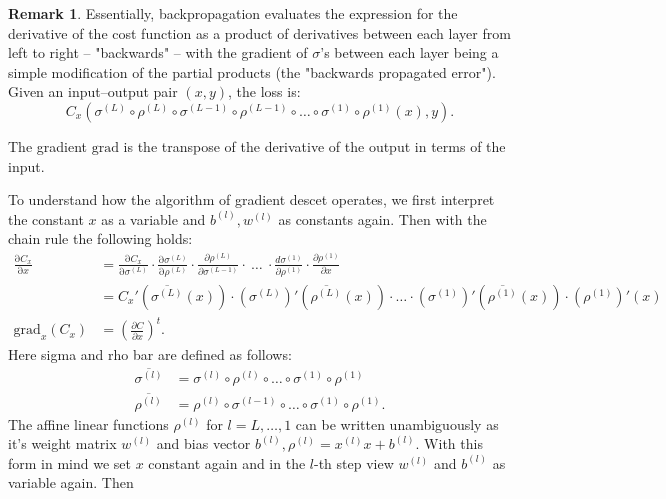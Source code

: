 \documentclass{article}
\theoremstyle{definition}
\newtheorem{remark}[theorem]{Remark}
\begin{document}
\begin{remark}
\label{com:back_prop_madness}
Essentially, backpropagation evaluates the expression for the derivative of the cost function as a product of derivatives between each layer from left to right – "backwards" – with the gradient of $\sigma$'s between each layer being a simple modification of the partial products (the "backwards propagated error").
Given an input–output pair $(x,y)$, the loss is:
$$C_{x}(\sigma^{(L)} \circ \rho^{(L)} \circ \sigma^{(L-1)} \circ \rho^{(L-1)} \circ \dots \circ \sigma^{(1)} \circ \rho^{(1)}(x), y).$$


The gradient $\text{grad}$ is the transpose of the derivative of the output in terms of the input.

To understand how the algorithm of gradient descet operates, we first interpret the constant $x$ as a variable and $b^{(l)}, w^{(l)}$ as constants again. Then with the chain rule the following holds:
\begin{align*}
\frac{\mathrm \partial C_{x}}{\mathrm \partial x} &= \frac{\mathrm \partial C_{x}}{\mathrm \partial \sigma^{(L)}} \cdot \frac{\mathrm \partial \sigma^{(L)}}{\mathrm \partial \rho^{(L)}} \cdot \frac{\partial \rho^{(L)}}{\partial \sigma^{(L-1)}} \cdot \ \ldots \ \cdot \frac{d \sigma^{(1)}}{\partial \rho^{(1)}} \cdot \frac{\partial \rho^{(1)}}{\partial x}\\
 &= C_{x}'(\overline{\sigma^{(L)}}(x)) \cdot (\sigma^{(L)})'(\overline{\rho^{(L)}}(x)) \cdot \dots \cdot (\sigma^{(1)})'(\overline{\rho^{(1)}}(x)) \cdot (\rho^{(1)})'(x) \\
\text{grad}_{x} (C_{x}) &= \left(\frac{\partial C}{\partial x}\right)^{t}.
\end{align*}
Here sigma and rho bar are defined as follows:
\begin{align*}
\overline{\sigma^{(l)}} &= \sigma^{(l)} \circ \rho^{(l)} \circ \dots \circ \sigma^{(1)} \circ \rho^{(1)} \\
\overline{\rho^{(l)}} &= \rho^{(l)} \circ \sigma^{(l-1)} \circ \dots \circ \sigma^{(1)} \circ \rho^{(1)}.
\end{align*}
The affine linear functions $\rho^{(l)}$ for $l=L, \dots , 1$ can be written unambiguously as it's weight matrix $w^{(l)}$ and bias vector $b^{(l)}, \rho^{(l)} = x^{(l)} x + b^{(l)}$. 
With this form in mind we set $x$ constant again and in the $l$-th step view $w^{(l)}$ and $b^{(l)}$ as variable again. Then


\end{remark}
\end{document}
